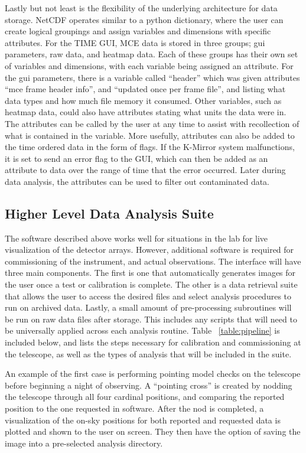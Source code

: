 \documentclass[manuscript]{aastex}
\begin{document}
Lastly but not least is the flexibility of the underlying architecture for data storage. NetCDF operates similar to a python dictionary, where the user can create logical groupings and assign variables and dimensions with specific attributes. For the TIME GUI, MCE data is stored in three groups; gui parameters, raw data, and heatmap data. Each of these groups has their own set of variables and dimensions, with each variable being assigned an attribute. For the gui parameters, there is a variable called ``header'' which was given attributes ``mce frame header info'', and ``updated once per frame file'', and listing what data types and how much file memory it consumed. Other variables, such as heatmap data, could also have attributes stating what units the data were in. The attributes can be called by the user at any time to assist with recollection of what is contained in the variable. More usefully, attributes can also be added to the time ordered data in the form of flags. If the K-Mirror system malfunctions, it is set to send an error flag to the GUI, which can then be added as an attribute to data over the range of time that the error occurred. Later during data analysis, the attributes can be used to filter out contaminated data. 

\subsection{Higher Level Data Analysis Suite}

The software described above works well for situations in the lab for live visualization of the detector arrays. However, additional software is required for commissioning of the instrument, and actual observations. The interface will have three main components. The first is one that automatically generates images for the user once a test or calibration is complete. The other is a data retrieval suite that allows the user to access the desired files and select analysis procedures to run on archived data. Lastly, a small amount of pre-processing subroutines will be run on raw data files after storage. This includes any scripts that will need to be universally applied across each analysis routine. Table ~\ref{table:pipeline} is included below, and lists the steps necessary for calibration and commissioning at the telescope, as well as the types of analysis that will be included in the suite. 

An example of the first case is performing pointing model checks on the telescope before beginning a night of observing. A ``pointing cross'' is created by nodding the telescope through all four cardinal positions, and comparing the reported position to the one requested in software. After the nod is completed, a visualization of the on-sky positions for both reported and requested data is plotted and shown to the user on screen. They then have the option of saving the image into a pre-selected analysis directory. 
\end{document}
